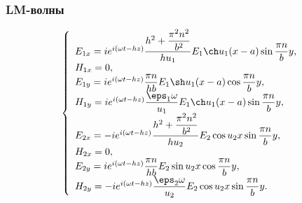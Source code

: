 \subsubsection{LM-волны}
\[
    \left\{
    \begin{array}{l}
        E_{1x} = i e^{i(\omega t - h z)}\frac{h^2 + \frac{\pi^2 n^2}{b^2}}
            {hu_1}E_1\ch u_1 (x-a) \sin \frac{\pi n}{b}y,\\
        H_{1x} = 0,\\
        E_{1y} = i e^{i(\omega t - h z)}\frac{\pi n}{hb}
            E_1\sh u_1 (x-a) \cos \frac{\pi n}{b}y,\\
        H_{1y} = i e^{i(\omega t - h z)}\frac{\eps_1\omega}{u_1}E_1
            \ch u_1 (x-a) \sin \frac{\pi n}{b}y,\\

        E_{2x} = -i e^{i(\omega t - h z)}\frac{h^2 + \frac{\pi^2 n^2}{b^2}}
            {hu_2}E_2\cos u_2 x \sin \frac{\pi n}{b}y,\\
        H_{2x} = 0,\\
        E_{2y} = i e^{i(\omega t - h z)}\frac{\pi n}{hb}
            E_2\sin u_2 x \cos \frac{\pi n}{b}y,\\
        H_{2y} = -i e^{i(\omega t - h z)} \frac{\eps_2\omega}{u_2}
            E_2\cos u_2 x \sin \frac{\pi n}{b}y.\\
    \end{array}
    \right.
\]

